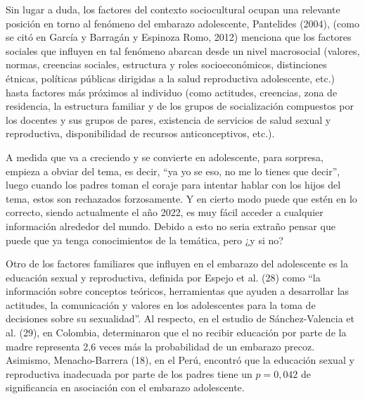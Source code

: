 \documentclass[letterpaper, 12pt]{article}
\begin{document}
\begin{displayquote}
    Sin lugar a duda, los factores del contexto sociocultural ocupan una relevante posición en
    torno al fenómeno del embarazo adolescente, Pantelides (2004), (como se citó en García y Barragán y
    Espinoza Romo, 2012) menciona que los factores sociales que influyen en tal fenómeno abarcan
    desde un nivel macrosocial (valores, normas, creencias sociales, estructura y roles socioeconómicos,
    distinciones étnicas, políticas públicas dirigidas a la salud reproductiva adolescente, etc.) hasta
    factores más próximos al individuo (como actitudes, creencias, zona de residencia, la estructura
    familiar y de los grupos de socialización compuestos por los docentes y sus grupos de pares,
    existencia de servicios de salud sexual y reproductiva, disponibilidad de recursos anticonceptivos,
    etc.).

    \textcite{Garcia2017}

\end{displayquote}

A medida que va a creciendo y se convierte en adolescente,
para sorpresa, empieza a obviar del tema, es decir, ``ya yo
se eso, no me lo tienes que decir'', luego cuando los
padres toman el coraje para intentar hablar con los hijos
del tema, estos son rechazados forzosamente. Y en cierto
modo puede que estén en lo correcto, siendo actualmente el
año 2022, es muy fácil acceder a cualquier información
alrededor del mundo. Debido a esto no seria extraño pensar
que puede que ya tenga conocimientos de la temática, pero
¿y si no?

\begin{displayquote}
    Otro de los factores familiares que influyen en el embarazo del adolescente es la educación
    sexual y reproductiva, definida por Espejo et al. (28) como “la información
    sobre conceptos teóricos, herramientas que ayuden a desarrollar las actitudes, la comunicación
    y valores en los adolescentes para la toma de decisiones sobre su sexualidad”. Al respecto, en
    el estudio de Sánchez-Valencia et al. (29), en Colombia, determinaron
    que el no recibir educación por parte de la madre representa 2,6 veces más
    la probabilidad de un embarazo precoz. Asimismo, Menacho-Barrera (18), en
    el Perú, encontró que la educación sexual y reproductiva inadecuada por
    parte de los padres tiene un $p = 0,042$ de significancia en asociación
    con el embarazo adolescente.

    \textcite{CubaSancho2022}
\end{displayquote}
\end{document}
